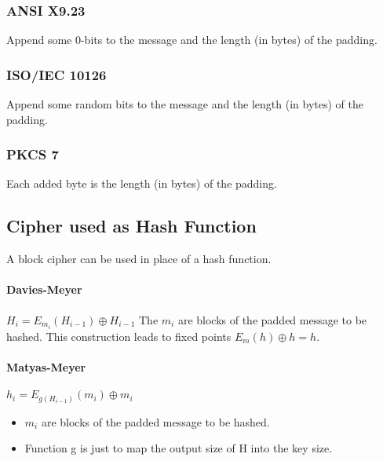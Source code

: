 \subsubsection{ANSI X9.23}
Append some 0-bits to the message and the length (in bytes) of the padding.

\subsubsection{ISO/IEC 10126}
Append some random bits to the message and the length (in bytes) of the padding.

\subsubsection{PKCS 7}
Each added byte is the length (in bytes) of the padding.

\subsection{Cipher used as Hash Function}
A block cipher can be used in place of a hash function.
\paragraph{Davies-Meyer} $H_i=E_{m_i}(H_{i-1})\oplus H_{i-1}$ The $m_i$ are
blocks of the padded message to be hashed. This construction leads to fixed
points $E_m(h)\oplus h=h$.
\paragraph{Matyas-Meyer} $h_i = E_{g(H_{i-1})}(m_i)\oplus m_i$
\begin{itemize}
    \item $m_i$ are blocks of the padded message to be hashed.
    \item Function g is just to map the output size of H into the key size.
\end{itemize}


